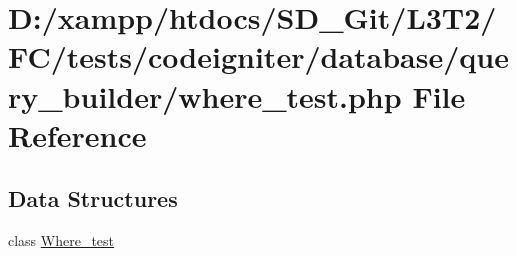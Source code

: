 \hypertarget{tests_2codeigniter_2database_2query__builder_2where__test_8php}{}\section{D\+:/xampp/htdocs/\+S\+D\+\_\+\+Git/\+L3\+T2/\+F\+C/tests/codeigniter/database/query\+\_\+builder/where\+\_\+test.php File Reference}
\label{tests_2codeigniter_2database_2query__builder_2where__test_8php}
\subsection*{Data Structures}
\begin{DoxyCompactItemize}
\item 
class \hyperlink{class_where__test}{Where\+\_\+test}
\end{DoxyCompactItemize}
